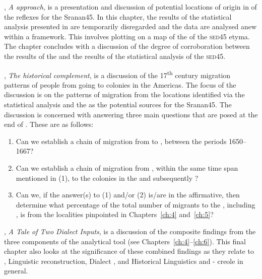 , \emph{A  approach}, is a presentation and discussion of potential locations of origin in  of the  reflexes for the Sranan45. In this chapter, the results of the statistical analysis presented in  are temporarily disregarded and the data are analysed anew within a  framework. This involves plotting on a map of  the  of the \textsc{sed45} etyma. The chapter concludes with a discussion of the degree of corroboration between the results of the  and the results of the statistical analysis of the  \textsc{sed45}.

, \emph{The historical complement}, is a discussion of the 17\textsuperscript{th} century migration patterns of people from  going to  colonies in the Americas. The focus of the discussion is on the patterns of migration from the locations identified via the statistical analysis and the  as the potential sources for the Sranan45. The discussion is concerned with answering three main questions that are posed at the end of . These are as follows:

\begin{enumerate}
\item Can we establish a chain of migration from  to , between the periods 1650--1667?
\item Can we establish a chain of migration from , within the same time span mentioned in (1), to the  colonies in the  and subsequently ?
\item Can we, if the answer(s) to (1) and/or (2) is/are in the affirmative, then determine what percentage of the total number of migrants to the , including , is from the localities pinpointed in Chapters~\ref{ch:4} and~\ref{ch:5}?
\end{enumerate}

, \emph{A Tale of Two Dialect Inputs}, is a discussion of the composite findings from the three components of the analytical tool (see Chapters~\ref{ch:4}--\ref{ch:6}). This final chapter also looks at the significance of these combined findings as they relate to , Linguistic reconstruction, Dialect ,  and Historical Linguistics and - creole  in general.

